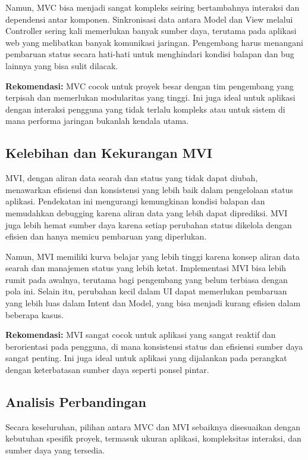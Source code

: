 \documentclass[conference]{IEEEtran}
\begin{document}
Namun, MVC bisa menjadi sangat kompleks seiring bertambahnya interaksi dan dependensi antar komponen. Sinkronisasi data antara Model dan View melalui Controller sering kali memerlukan banyak sumber daya, terutama pada aplikasi web yang melibatkan banyak komunikasi jaringan. Pengembang harus menangani pembaruan status secara hati-hati untuk menghindari kondisi balapan dan bug lainnya yang bisa sulit dilacak.

\textbf{Rekomendasi:} MVC cocok untuk proyek besar dengan tim pengembang yang terpisah dan memerlukan modularitas yang tinggi. Ini juga ideal untuk aplikasi dengan interaksi pengguna yang tidak terlalu kompleks atau untuk sistem di mana performa jaringan bukanlah kendala utama.

\subsection{Kelebihan dan Kekurangan MVI}

MVI, dengan aliran data searah dan status yang tidak dapat diubah, menawarkan efisiensi dan konsistensi yang lebih baik dalam pengelolaan status aplikasi. Pendekatan ini mengurangi kemungkinan kondisi balapan dan memudahkan debugging karena aliran data yang lebih dapat diprediksi. MVI juga lebih hemat sumber daya karena setiap perubahan status dikelola dengan efisien dan hanya memicu pembaruan yang diperlukan.

Namun, MVI memiliki kurva belajar yang lebih tinggi karena konsep aliran data searah dan manajemen status yang lebih ketat. Implementasi MVI bisa lebih rumit pada awalnya, terutama bagi pengembang yang belum terbiasa dengan pola ini. Selain itu, perubahan kecil dalam UI dapat memerlukan pembaruan yang lebih luas dalam Intent dan Model, yang bisa menjadi kurang efisien dalam beberapa kasus.

\textbf{Rekomendasi:} MVI sangat cocok untuk aplikasi yang sangat reaktif dan berorientasi pada pengguna, di mana konsistensi status dan efisiensi sumber daya sangat penting. Ini juga ideal untuk aplikasi yang dijalankan pada perangkat dengan keterbatasan sumber daya seperti ponsel pintar.

\subsection{Analisis Perbandingan}

Secara keseluruhan, pilihan antara MVC dan MVI sebaiknya disesuaikan dengan kebutuhan spesifik proyek, termasuk ukuran aplikasi, kompleksitas interaksi, dan sumber daya yang tersedia. 
\end{document}
